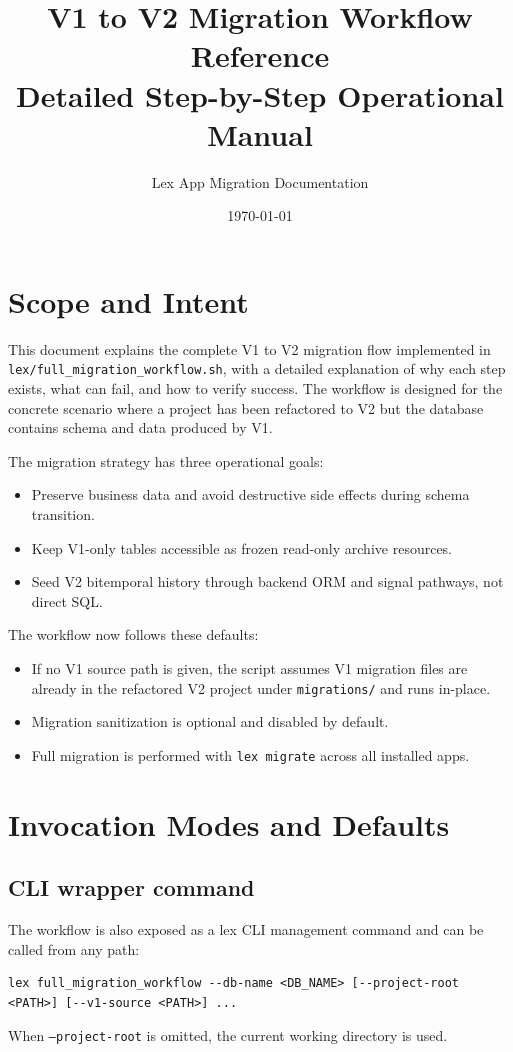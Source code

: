 \documentclass[11pt,a4paper]{article}
\title{V1 to V2 Migration Workflow Reference\\
\large Detailed Step-by-Step Operational Manual}
\author{Lex App Migration Documentation}
\date{\today}
\begin{document}
\maketitle
\tableofcontents
\newpage

\section{Scope and Intent}
This document explains the complete V1 to V2 migration flow implemented in
\texttt{lex/full\_migration\_workflow.sh}, with a detailed explanation of why each
step exists, what can fail, and how to verify success. The workflow is designed
for the concrete scenario where a project has been refactored to V2 but the database
contains schema and data produced by V1.

The migration strategy has three operational goals:
\begin{itemize}[leftmargin=1.5em]
  \item Preserve business data and avoid destructive side effects during schema transition.
  \item Keep V1-only tables accessible as frozen read-only archive resources.
  \item Seed V2 bitemporal history through backend ORM and signal pathways, not direct SQL.
\end{itemize}

The workflow now follows these defaults:
\begin{itemize}[leftmargin=1.5em]
  \item If no V1 source path is given, the script assumes V1 migration files are already
  in the refactored V2 project under \texttt{migrations/} and runs in-place.
  \item Migration sanitization is optional and disabled by default.
  \item Full migration is performed with \texttt{lex migrate} across all installed apps.
\end{itemize}

\section{Invocation Modes and Defaults}
\subsection*{CLI wrapper command}
The workflow is also exposed as a lex CLI management command and can be called from any path:
\begin{verbatim}
lex full_migration_workflow --db-name <DB_NAME> [--project-root <PATH>] [--v1-source <PATH>] ...
\end{verbatim}
When \texttt{--project-root} is omitted, the current working directory is used.
\end{document}
